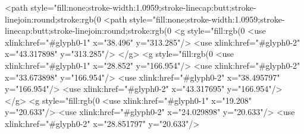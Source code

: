 <path style="fill:none;stroke-width:1.0959;stroke-linecap:butt;stroke-linejoin:round;stroke:rgb(0%
<path style="fill:none;stroke-width:1.0959;stroke-linecap:butt;stroke-linejoin:round;stroke:rgb(0%
<g style="fill:rgb(0%
  <use xlink:href="#glyph0-1" x="38.496" y="313.285"/>
  <use xlink:href="#glyph0-2" x="43.317898" y="313.285"/>
</g>
<g style="fill:rgb(0%
  <use xlink:href="#glyph0-1" x="28.852" y="166.954"/>
  <use xlink:href="#glyph0-2" x="33.673898" y="166.954"/>
  <use xlink:href="#glyph0-2" x="38.495797" y="166.954"/>
  <use xlink:href="#glyph0-2" x="43.317695" y="166.954"/>
</g>
<g style="fill:rgb(0%
  <use xlink:href="#glyph0-1" x="19.208" y="20.633"/>
  <use xlink:href="#glyph0-2" x="24.029898" y="20.633"/>
  <use xlink:href="#glyph0-2" x="28.851797" y="20.633"/>
